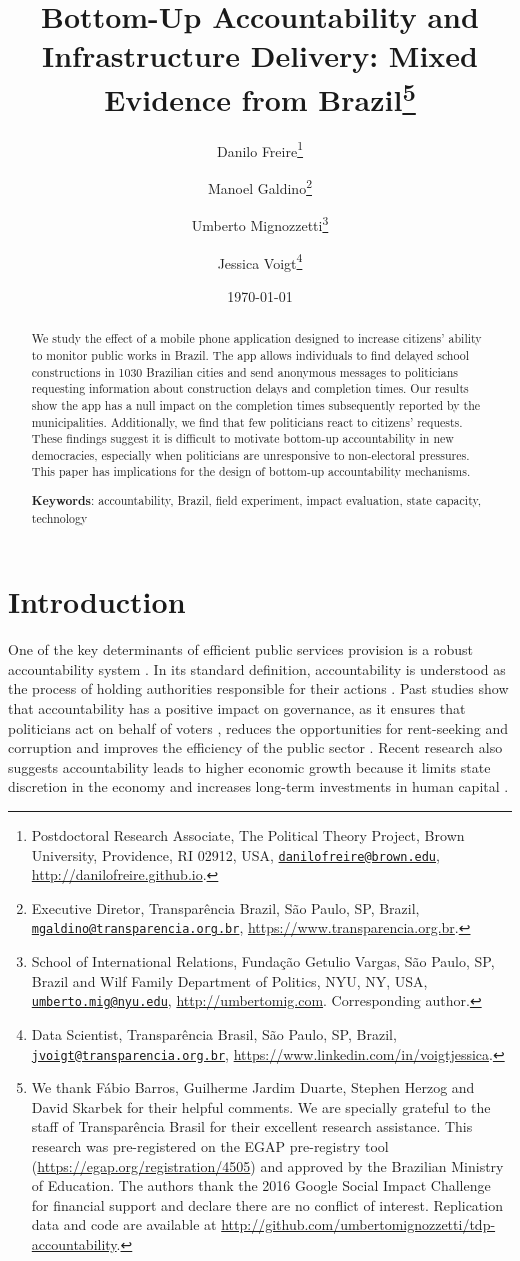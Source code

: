 \documentclass[12pt,a4paper,]{article}
\title{Bottom-Up Accountability and Infrastructure Delivery: Mixed Evidence
from Brazil\thanks{We thank Fábio Barros, Guilherme Jardim Duarte, Stephen Herzog and David
Skarbek for their helpful comments. We are specially grateful to the
staff of Transparência Brasil for their excellent research assistance.
This research was pre-registered on the EGAP pre-registry tool
(\url{https://egap.org/registration/4505}) and approved by the Brazilian
Ministry of Education. The authors thank the 2016 Google Social Impact
Challenge for financial support and declare there are no conflict of
interest. Replication data and code are available at
\url{http://github.com/umbertomignozzetti/tdp-accountability}.}}
\author{Danilo Freire\footnote{Postdoctoral Research Associate, The Political
  Theory Project, Brown University, Providence, RI 02912, USA,
  \href{mailto:danilofreire@brown.edu}{\nolinkurl{danilofreire@brown.edu}},
  \url{http://danilofreire.github.io}.} \and Manoel Galdino\footnote{Executive Diretor, Transparência Brazil, São
  Paulo, SP, Brazil,
  \href{mailto:mgaldino@transparencia.org.br}{\nolinkurl{mgaldino@transparencia.org.br}},
  \url{https://www.transparencia.org.br}.} \and Umberto Mignozzetti\footnote{School of International Relations, Fundação
  Getulio Vargas, São Paulo, SP, Brazil and Wilf Family Department of
  Politics, NYU, NY, USA,
  \href{mailto:umberto.mig@nyu.edu}{\nolinkurl{umberto.mig@nyu.edu}},
  \url{http://umbertomig.com}. Corresponding author.} \and Jessica Voigt\footnote{Data Scientist, Transparência Brasil, São Paulo,
  SP, Brazil,
  \href{mailto:jvoigt@transparencia.org.br}{\nolinkurl{jvoigt@transparencia.org.br}},
  \url{https://www.linkedin.com/in/voigtjessica}.}}
\date{\today}
\begin{document}
\maketitle

\begin{abstract}
\doublespacing \noindent We study the effect of a mobile phone application designed to increase
citizens' ability to monitor public works in Brazil. The app allows
individuals to find delayed school constructions in 1030 Brazilian
cities and send anonymous messages to politicians requesting information
about construction delays and completion times. Our results show the app
has a null impact on the completion times subsequently reported by the
municipalities. Additionally, we find that few politicians react to
citizens' requests. These findings suggest it is difficult to motivate
bottom-up accountability in new democracies, especially when politicians
are unresponsive to non-electoral pressures. This paper has implications
for the design of bottom-up accountability mechanisms.
\vspace{.25cm}

\noindent \textbf{Keywords}: accountability, Brazil, field experiment, impact evaluation, state
capacity, technology
\vspace{.25cm}

\end{abstract}


\newpage

\hypertarget{introduction}{%
\section{Introduction}\label{introduction}}

\label{sec:intro}

One of the key determinants of efficient public services provision is a
robust accountability system
\citep{besley2003incentives, cameron2004public, ferejohn1986incumbent, o1998horizontal}.
In its standard definition, accountability is understood as the process
of holding authorities responsible for their actions
\citep{finer1941administrative, mulgan2000accountability, o1990bureaucratic}.
Past studies show that accountability has a positive impact on
governance, as it ensures that politicians act on behalf of voters
\citep{freire2010ngp, moncrieffe1998reconceptualizing}, reduces the
opportunities for rent-seeking and corruption
\citep{deininger2005does, wenar2006accountability} and improves the
efficiency of the public sector
\citep{adsera2003you, bjorkman2009power}. Recent research also suggests
accountability leads to higher economic growth because it limits state
discretion in the economy and increases long-term investments in human
capital
\citep{benhabib2010economic, suebvises2018social, ponzetto2018social}.
\end{document}
